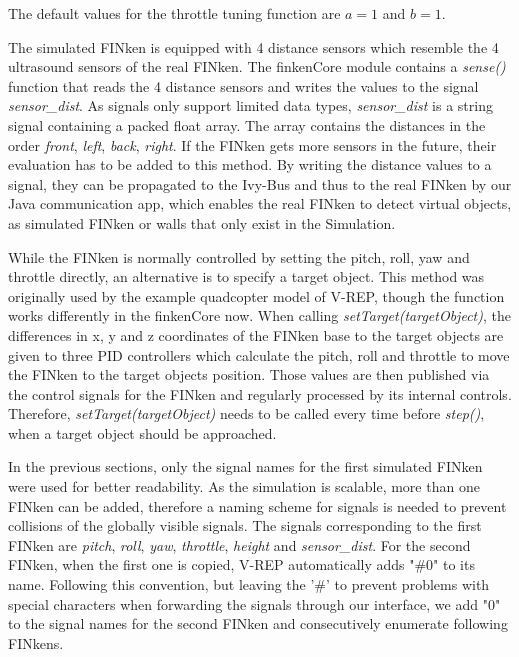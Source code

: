 The default values for the throttle tuning function are  $a = 1$ and $b = 1$. 

The simulated FINken is equipped with 4 distance sensors which resemble the 4 ultrasound sensors of the real FINken. The finkenCore module contains a \textit{sense()} function that reads the 4 distance sensors and writes the values to the signal \textit{sensor\_dist}. As signals only support limited data types, \textit{sensor\_dist} is a string signal containing a packed float array. The array contains the distances in the order \textit{front}, \textit{left}, \textit{back}, \textit{right}.  
If the FINken gets more sensors in the future, their evaluation has to be added to this method.
By writing the distance values to a signal, they can be propagated to the Ivy-Bus and thus to the real FINken by our Java communication app, which enables the real FINken to detect virtual objects, as simulated FINken or walls that only exist in the Simulation.

While the FINken is normally controlled by setting the pitch, roll, yaw and throttle directly, an alternative is to specify a target object.
This method was originally used by the example quadcopter model of V-REP, though the function works differently in the finkenCore now. 
When calling  \textit{setTarget(targetObject)}, the differences in x, y and z coordinates of the FINken base to the target objects are given to three \gls{PID} controllers which calculate the pitch, roll and throttle to move the FINken to the target objects position. 
Those values are then published via the control signals for the FINken and regularly processed by its internal controls. 
Therefore, \textit{setTarget(targetObject)} needs to be called every time before \textit{step()}, when a target object should be approached.

In the previous sections, only the signal names for the first simulated FINken were used for better readability. 
As the simulation is scalable, more than one FINken can be added, therefore a naming scheme for signals is needed to prevent collisions of the globally visible signals. 
The signals corresponding to the first FINken are \textit{pitch}, \textit{roll}, \textit{yaw}, \textit{throttle}, \textit{height} and \textit{sensor\_dist}. 
For the second FINken, when the first one is copied, V-REP automatically adds "\#0" to its name. 
Following this convention, but leaving the '\#' to prevent problems with special characters when forwarding the signals through our interface, we add "0" to the signal names for the second FINken and consecutively enumerate following FINkens.

